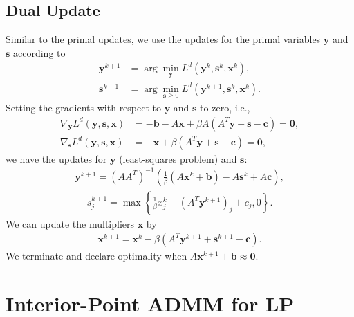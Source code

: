 \documentclass{article}
\begin{document}
\subsection*{Dual Update}
Similar to the primal updates, we use the updates for the primal variables $\mathbf{y}$ and $\mathbf{s}$ according to 
\begin{align}
\mathbf{y}^{k+1} & = \arg \min_{\mathbf{y}} L^{d}(\mathbf{y}^{k},\mathbf{s}^k, \mathbf{x}^{k}),\\
\mathbf{s}^{k+1} & = \arg \min_{\mathbf{s} \geq 0} L^{d}(\mathbf{y}^{k+1},\mathbf{s}^k,\mathbf{x}^{k}).
\end{align}
Setting the gradients with respect to $\mathbf{y}$ and $\mathbf{s}$ to zero, i.e.,
\begin{align}
\nabla_{\mathbf{y}}L^{d}(\mathbf{y},\mathbf{s},\mathbf{x}) & =  -\mathbf{b}-A\mathbf{x}+\beta A\left(A^{T}\mathbf{y}+\mathbf{s}-\mathbf{c}\right)  = \mathbf{0}, \label{eq:dual_y} \\
\nabla_{\mathbf{s}}L^{d}(\mathbf{y},\mathbf{s},\mathbf{x}) & =  -\mathbf{x}+\beta\left(A^{T}\mathbf{y}+\mathbf{s}-\mathbf{c}\right) =  \mathbf{0},
\end{align}
we have the updates for $\mathbf{y}$ (least-squares problem) and $\mathbf{s}$:
\begin{align}\label{eq:y_dual_update}
\mathbf{y}^{k+1} = \left(AA^{T}\right)^{-1}\left(\frac{1}{\beta}\left(A\mathbf{x}^{k}+\mathbf{b}\right)-A\mathbf{s}^{k}+A\mathbf{c}\right),
\end{align}
\begin{align}\label{eq:s_dual_update}
s_j^{k+1} = \max\left\{ \frac{1}{\beta}{x}_j^k-(A^{T}\mathbf{y}^{k+1})_j+{c}_j,0\right\}.
\end{align}
We can update the multipliers $\mathbf{x}$ by
\begin{align}\label{eq:x_dual_update}
\mathbf{x}^{k+1} = \mathbf{x}^k - \beta\left(A^T \mathbf{y}^{k+1} + \mathbf{s}^{k+1} - \mathbf{c}\right).
\end{align}
We terminate and declare optimality when $A \mathbf{x}^{k+1} + \mathbf{b} \approx \mathbf{0}$.


\vspace{0.5in}
\section{Interior-Point ADMM for LP}

\vspace{0.1in}
\end{document}

